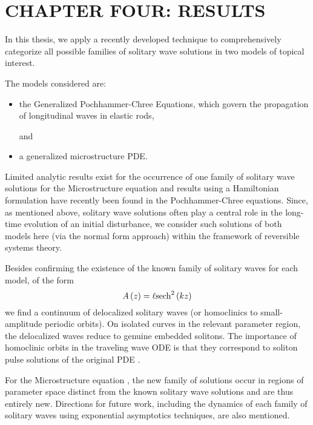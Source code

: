 \chapter{CHAPTER FOUR: RESULTS} \label{chapter_4}

In this thesis, we apply a recently developed technique to
comprehensively categorize all possible families of solitary wave
solutions in two models of topical interest.

The models considered are:
\begin{itemize}
\item the Generalized Pochhammer-Chree Equations, which  govern the propagation of longitudinal waves in elastic rods,

and

\item a generalized microstructure PDE.
\end{itemize}

Limited analytic results exist for the occurrence of one family of  solitary
wave solutions for the Microstructure equation and results using a Hamiltonian
formulation have recently been found in the Pochhammer-Chree equations. Since, as
mentioned above, solitary wave solutions often play a central role in the
long-time evolution of an initial disturbance, we consider such solutions of
both models here (via the normal form approach) within the framework of
reversible systems theory.

Besides confirming the existence of the known family of solitary waves for each
model, of the form
\begin{equation} 
A\left(z\right) = \ell \space \mathrm{sech}^2\left(k z\right)
\end{equation}
we find a continuum of delocalized solitary waves (or homoclinics to
small-amplitude periodic orbits).  On isolated curves in the relevant parameter
region, the delocalized waves reduce to genuine embedded solitons. The importance
of homoclinic orbits in the traveling wave ODE is that they correspond to soliton
pulse solutions of the original PDE \cite{IA}.

For the Microstructure equation , the new family of solutions occur in regions
of parameter space distinct from the known solitary wave solutions and are thus
entirely new.  Directions for future work, including the dynamics of each family
of solitary waves using exponential asymptotics techniques, are also mentioned.

